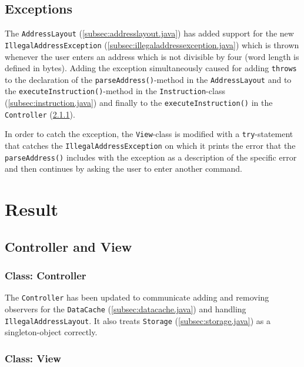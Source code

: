 \documentclass[a4paper]{scrreprt}
\begin{document}
\section{Exceptions}
The \texttt{AddressLayout} (\ref{subsec:addresslayout.java}) has added support for the new \texttt{IllegalAddressException} (\ref{subsec:illegaladdressexception.java}) which is thrown whenever the user enters an address which is not divisible by four (word length is defined in bytes). Adding the exception simultaneously caused for adding \texttt{throws} to the declaration of the \texttt{parseAddress()}-method in the \texttt{AddressLayout} and to the \texttt{executeInstruction()}-method in the \texttt{Instruction}-class (\ref{subsec:instruction.java}) and finally to the \texttt{executeInstruction()} in the \texttt{Controller} (\ref{subsec:controller.java}).

In order to catch the exception, the \texttt{View}-class is modified with a \texttt{try}-statement that catches the \texttt{IllegalAddressException} on which it prints the error that the \texttt{parseAddress()} includes with the exception as a description of the specific error and then continues by asking the user to enter another command.

\chapter{Result}
\label{sec:result}

\section{Controller and View}
\label{sec:sup}

\subsection{Class: Controller}
\label{subsec:controller.java}

The \texttt{Controller} has been updated to communicate adding and removing observers for the \texttt{DataCache} (\ref{subsec:datacache.java}) and handling \texttt{IllegalAddressLayout}. It also treats \texttt{Storage} (\ref{subsec:storage.java}) as a singleton-object correctly.



\subsection{Class: View}
\label{subsec:view.java}
\end{document}
